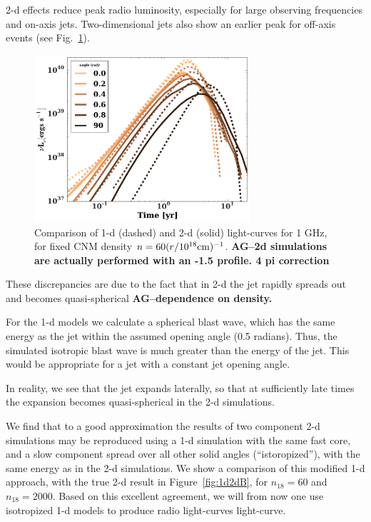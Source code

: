 \documentclass[usenatbib,fleqn]{mn2e}
\begin{document}
2-d effects reduce peak radio luminosity, especially for large
observing frequencies and on-axis jets. Two-dimensional jets also show
an earlier peak for off-axis events (see Fig.~\ref{fig:1d2d}).

\begin{figure}
\includegraphics[width=8cm]{comparison_1ghz.pdf}
\caption{\label{fig:1d2d} Comparison of 1-d (dashed) and 2-d (solid)
  light-curves for 1 GHz, for fixed CNM density $n=60
    (r/10^{18} {\rm cm})^{-1}$. {\bf AG--2d simulations are actually
      performed with an -1.5 profile. 4 pi correction}}
\end{figure}

These discrepancies are due to the fact that in 2-d the jet rapidly
spreads out and becomes quasi-spherical {\bf AG--dependence on
  density.} 

For the 1-d models we calculate a spherical blast wave, which has the
same energy as the jet within the assumed opening angle (0.5 radians).
Thus, the simulated isotropic blast wave is much greater than the energy of
the jet. This would be appropriate for a jet with a constant jet
opening angle.

In reality, we see that the jet expands laterally, so that at
sufficiently late times the expansion becomes quasi-spherical in the
2-d simulations.

We find that to a good approximation the results of two component 2-d
simulations may be reproduced using a 1-d simulation with the same
fast core, and a slow component spread over all other solid angles
(``istoropized''), with the same energy as in the 2-d simulations.  We
show a comparison of this modified 1-d approach, with the true 2-d
result in Figure~\ref{fig:1d2dB}, for $n_{18}=60$ and $n_{18}=2000$.
Based on this excellent agreement, we will from now one use
  isotropized 1-d models to produce radio light-curves light-curve.
\end{document}
